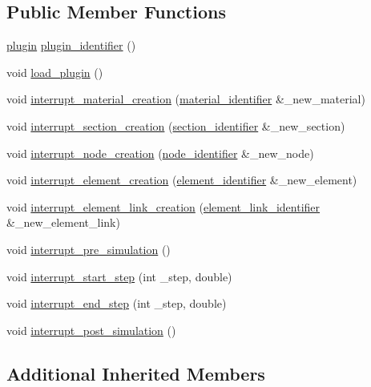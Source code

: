 \subsection*{Public Member Functions}
\begin{DoxyCompactItemize}
\item 
\hyperlink{plugins_8hh_af34747f68f9b0963dea6e8f3c659659c}{plugin} \hyperlink{classExample_aaa8ffc33c65da38507a78ff0558b9a0b}{plugin\+\_\+identifier} ()
\item 
void \hyperlink{classExample_ad360c0096bec1dcc3ee3476177922b9b}{load\+\_\+plugin} ()
\item 
void \hyperlink{classExample_a56e02424701a4ece2cdaf1d78e26e1ee}{interrupt\+\_\+material\+\_\+creation} (\hyperlink{structmaterial__identifier}{material\+\_\+identifier} \&\+\_\+new\+\_\+material)
\item 
void \hyperlink{classExample_a3869ba072c8487da1c2b6bbc329780b7}{interrupt\+\_\+section\+\_\+creation} (\hyperlink{structsection__identifier}{section\+\_\+identifier} \&\+\_\+new\+\_\+section)
\item 
void \hyperlink{classExample_a9f27f6e717db44baf27a1ed29584037a}{interrupt\+\_\+node\+\_\+creation} (\hyperlink{structnode__identifier}{node\+\_\+identifier} \&\+\_\+new\+\_\+node)
\item 
void \hyperlink{classExample_a2faa03f186d79fd113db8101e46b6b47}{interrupt\+\_\+element\+\_\+creation} (\hyperlink{structelement__identifier}{element\+\_\+identifier} \&\+\_\+new\+\_\+element)
\item 
void \hyperlink{classExample_a89228b638604306864d5544808edd94d}{interrupt\+\_\+element\+\_\+link\+\_\+creation} (\hyperlink{structelement__link__identifier}{element\+\_\+link\+\_\+identifier} \&\+\_\+new\+\_\+element\+\_\+link)
\item 
void \hyperlink{classExample_a2cdb7dc01165c9816dcbf5694fa741ff}{interrupt\+\_\+pre\+\_\+simulation} ()
\item 
void \hyperlink{classExample_aea2b516017d673a4c3e1d6c92aa06f8a}{interrupt\+\_\+start\+\_\+step} (int \+\_\+step, double)
\item 
void \hyperlink{classExample_ada33e15e3a0e4ff7cfc3c1cfad26a7bf}{interrupt\+\_\+end\+\_\+step} (int \+\_\+step, double)
\item 
void \hyperlink{classExample_a3835b961774e2cd2eeae6af3e325b4be}{interrupt\+\_\+post\+\_\+simulation} ()
\end{DoxyCompactItemize}
\subsection*{Additional Inherited Members}


